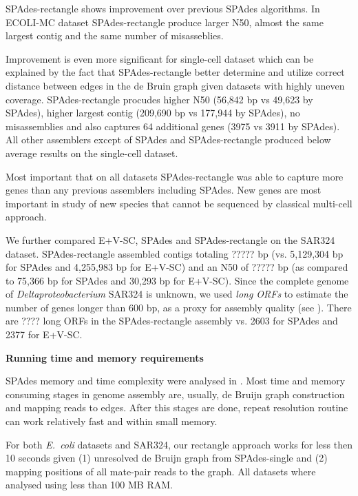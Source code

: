 \documentclass[a4paper]{article}
\def\ecoli{\emph{E.~coli}}
\def\spades{SPAdes}
\begin{document}
{\spades}-rectangle shows improvement over previous SPAdes algorithms. In ECOLI-MC dataset {\spades}-rectangle produce larger N50, almost the same largest contig and the same number of misasseblies.

Improvement is even more significant for single-cell dataset which can be explained by the fact that {\spades}-rectangle better determine and utilize correct distance between edges in the de Bruin graph given datasets with highly uneven coverage. {\spades}-rectangle procudes higher N50 (56,842 bp vs 49,623 by {\spades}), higher largest contig (209,690 bp vs 177,944 by {\spades}), no misassemblies and also captures 64 additional genes (3975 vs 3911 by {\spades}). All other assemblers except of {\spades} and {\spades}-rectangle produced below average results on the single-cell dataset.

Most important that on all datasets {\spades}-rectangle was able to capture more genes than any previous assemblers including {\spades}. New genes are most important in study of new species that cannot be sequenced by classical multi-cell approach.

We further compared E+V-SC, {\spades} and {\spades}-rectangle on the SAR324 dataset.
{\spades}-rectangle assembled contigs totaling ????? bp
(vs. 5,129,304 bp for {\spades} and 4,255,983 bp for E+V-SC) and an N50 of ????? bp (as compared to 75,366 bp for {\spades} and 30,293 bp for E+V-SC).
Since the complete genome of \emph{Deltaproteobacterium} SAR324 is unknown,
we used {\em long ORFs} to estimate the number of genes longer than 600 bp, as a proxy for assembly quality (see \cite{Chitsaz2011}).
There are ???? long ORFs in the {\spades}-rectangle assembly
vs. 2603 for {\spades} and 2377 for E+V-SC.



\textbf{Running time and memory requirements}

SPAdes memory and time complexity were analysed in \cite{SPAdes}. Most time and memory consuming stages in genome assembly are, usually, de Bruijn graph construction and mapping reads to edges. After this stages are done, repeat resolution routine can work relatively fast and within small memory.

For both {\ecoli} datasets and SAR324, our rectangle approach works for less then 10 seconds given (1) unresolved de Bruijn graph from SPAdes-single and (2) mapping positions of all mate-pair reads to the graph. All datasets where analysed using less than 100 MB RAM.
\end{document}
